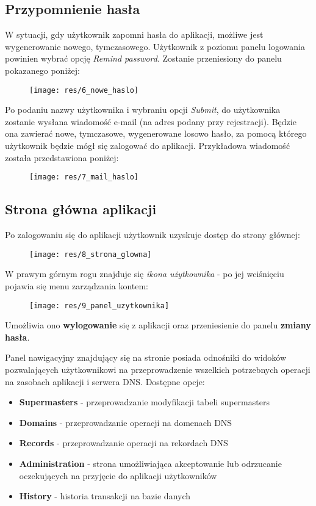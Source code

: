 \documentclass[12pt] {article}
\begin{document}
\subsection{Przypomnienie hasła}
W sytuacji, gdy użytkownik zapomni hasła do aplikacji, możliwe jest wygenerowanie nowego, tymczasowego. Użytkownik z poziomu panelu logowania powinien wybrać opcję \emph{Remind password}. Zostanie przeniesiony do panelu pokazanego poniżej:
\begin{figure}[H]
\centering
\texttt{[image: res/6\_nowe\_haslo]}
\end{figure}
Po podaniu nazwy użytkownika i wybraniu opcji \emph{Submit}, do użytkownika zostanie wysłana wiadomość e-mail (na adres podany przy rejestracji). Będzie ona zawierać nowe, tymczasowe, wygenerowane losowo hasło, za pomocą którego użytkownik będzie mógł się zalogować do aplikacji. Przykładowa wiadomość została przedstawiona poniżej:
\begin{figure}[H]
\centering
\texttt{[image: res/7\_mail\_haslo]}
\end{figure}

\subsection{Strona główna aplikacji}
Po zalogowaniu się do aplikacji użytkownik uzyskuje dostęp do strony głównej:
\begin{figure}[H]
\centering
\texttt{[image: res/8\_strona\_glowna]}
\end{figure}
W prawym górnym rogu znajduje się \emph{ikona użytkownika} - po jej wciśnięciu pojawia się menu zarządzania kontem:
\begin{figure}[H]
\centering
\texttt{[image: res/9\_panel\_uzytkownika]}
\end{figure}
Umożliwia ono \textbf{wylogowanie} się z aplikacji oraz przeniesienie do panelu \textbf{zmiany hasła}. 

Panel nawigacyjny znajdujący się na stronie posiada odnośniki do widoków pozwalających użytkownikowi na przeprowadzenie wszelkich potrzebnych operacji na zasobach aplikacji i serwera DNS. Dostępne opcje:
\begin{itemize}
\item \textbf{Supermasters} - przeprowadzanie modyfikacji tabeli supermasters
\item \textbf{Domains} - przeprowadzanie operacji na domenach DNS
\item \textbf{Records} - przeprowadzanie operacji na rekordach DNS
\item \textbf{Administration} - strona umożliwiająca akceptowanie lub odrzucanie oczekujących na przyjęcie do aplikacji użytkowników
\item \textbf{History} - historia transakcji na bazie danych
\end{itemize}
\end{document}
